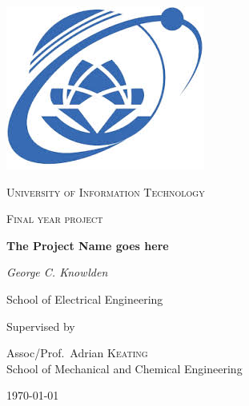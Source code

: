 \begin{titlepage}


\thispagestyle{empty}
\setlength\headheight{0pt} 
\begin{center}

\begin{center}
\includegraphics[width=0.25\linewidth]{images/uit.jpeg}            
\end{center}	

        \vspace{0.25cm}
        {\scshape\LARGE University of Information Technology \par}
        \vspace{0.25cm}
        {\scshape\Large Final year project\par}
        \vspace{0.5cm}

        {\Large\bfseries The Project Name goes here\par}
        
        \vspace{0.5cm}
        {\Large\itshape George C. Knowlden\par}
        School of Electrical Engineering
        \vspace{0.25cm}

\vspace{1cm}
Supervised by\par
Assoc/Prof.~Adrian \textsc{Keating} \\
School of Mechanical and Chemical Engineering\par
\vspace{1.5cm}
\large
\today

\end{center}

\clearpage
\restoregeometry
\end{titlepage}
